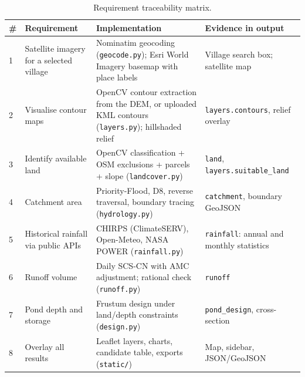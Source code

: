 \documentclass[11pt,a4paper]{article}
\newcommand{\code}[1]{\texttt{\small #1}}
\begin{document}
\begin{table}[H]
\centering\small
\caption{Requirement traceability matrix.}
\label{tab:trace}
\begin{tabularx}{\textwidth}{@{}p{0.4cm}>{\raggedright\arraybackslash}p{3.2cm}YY@{}}
\toprule
\# & Requirement & Implementation & Evidence in output \\
 & Satellite imagery for a selected village & Nominatim geocoding (\code{geocode.py}); Esri World Imagery basemap with place labels & Village search box; satellite map \\
2 & Visualise contour maps & OpenCV contour extraction from the DEM, or uploaded KML contours (\code{layers.py}); hillshaded relief & \code{layers.contours}, relief overlay \\
3 & Identify available land & OpenCV classification + OSM exclusions + parcels + slope (\code{landcover.py}) & \code{land}, \code{layers.suitable\_land} \\
4 & Catchment area & Priority-Flood, D8, reverse traversal, boundary tracing (\code{hydrology.py}) & \code{catchment}, boundary GeoJSON \\
5 & Historical rainfall via public APIs & CHIRPS (ClimateSERV), Open-Meteo, NASA POWER (\code{rainfall.py}) & \code{rainfall}: annual and monthly statistics \\
6 & Runoff volume & Daily SCS-CN with AMC adjustment; rational check (\code{runoff.py}) & \code{runoff} \\
7 & Pond depth and storage & Frustum design under land/depth constraints (\code{design.py}) & \code{pond\_design}, cross-section \\
8 & Overlay all results & Leaflet layers, charts, candidate table, exports (\code{static/}) & Map, sidebar, JSON/GeoJSON \\
\bottomrule
\end{tabularx}
\end{table}
\end{document}

